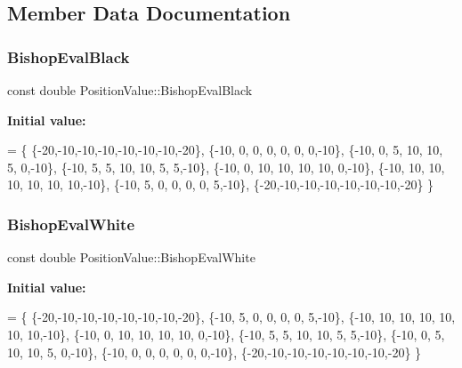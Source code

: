 \subsection{Member Data Documentation}
\mbox{\label{class_position_value_aa492a3e22caecca103849320217a4707}} 
\subsubsection{\texorpdfstring{Bishop\+Eval\+Black}{BishopEvalBlack}}
{\footnotesize\ttfamily const double Position\+Value\+::\+Bishop\+Eval\+Black\hspace{0.3cm}{\ttfamily [static]}}

{\bfseries Initial value\+:}
\begin{DoxyCode}
=
        \{
                \{-20,-10,-10,-10,-10,-10,-10,-20\},
                \{-10,  0,  0,  0,  0,  0,  0,-10\},
                \{-10,  0,  5, 10, 10,  5,  0,-10\},
                \{-10,  5,  5, 10, 10,  5,  5,-10\},
                \{-10,  0, 10, 10, 10, 10,  0,-10\},
                \{-10, 10, 10, 10, 10, 10, 10,-10\},
                \{-10,  5,  0,  0,  0,  0,  5,-10\},
                \{-20,-10,-10,-10,-10,-10,-10,-20\}
        \}
\end{DoxyCode}
\mbox{\label{class_position_value_ad604441bdc402c2929c771c6b107b4af}} 
\subsubsection{\texorpdfstring{Bishop\+Eval\+White}{BishopEvalWhite}}
{\footnotesize\ttfamily const double Position\+Value\+::\+Bishop\+Eval\+White\hspace{0.3cm}{\ttfamily [static]}}

{\bfseries Initial value\+:}
\begin{DoxyCode}
=
        \{
                \{-20,-10,-10,-10,-10,-10,-10,-20\},
                \{-10,  5,  0,  0,  0,  0,  5,-10\},
                \{-10, 10, 10, 10, 10, 10, 10,-10\},
                \{-10,  0, 10, 10, 10, 10,  0,-10\},
                \{-10,  5,  5, 10, 10,  5,  5,-10\},
                \{-10,  0,  5, 10, 10,  5,  0,-10\},
                \{-10,  0,  0,  0,  0,  0,  0,-10\},
                \{-20,-10,-10,-10,-10,-10,-10,-20\}
        \}
\end{DoxyCode}
\mbox{\label{class_position_value_aedabcf02811afe49b3680eee682882ed}} 
